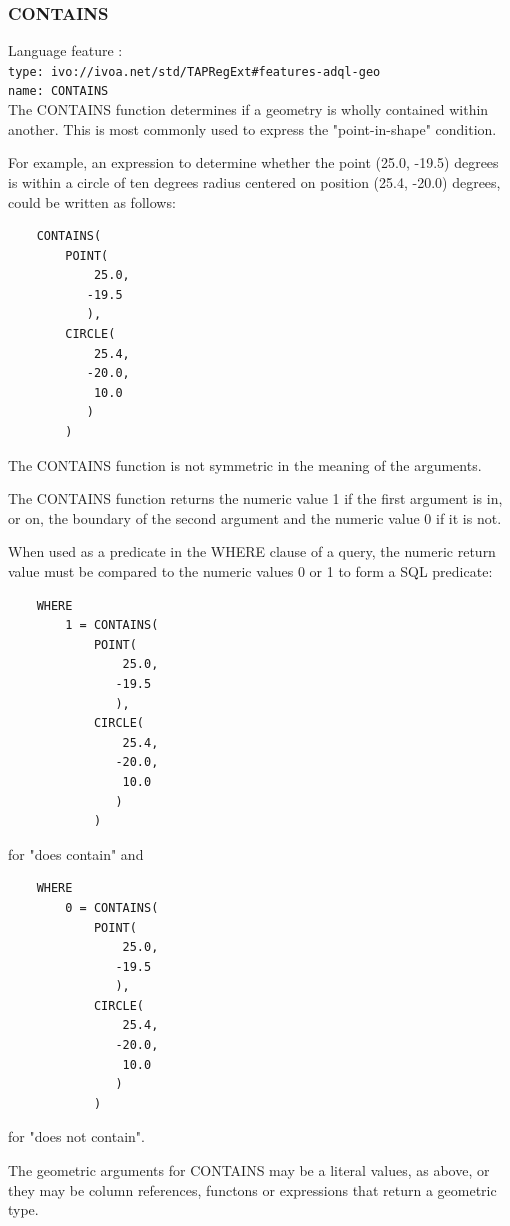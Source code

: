 \documentclass[11pt,a4paper]{ivoa}
\begin{document}
\subsubsection{CONTAINS}
\label{sec:functions.geom.contains}
{\footnotesize Language feature :}\\
{\footnotesize \verb|type: ivo://ivoa.net/std/TAPRegExt#features-adql-geo|}\\
{\footnotesize \verb|name: CONTAINS|}\\

The CONTAINS function determines if a geometry is wholly contained within
another. This is most commonly used to express the "point-in-shape" condition.

For example, an expression to determine whether the point (25.0, -19.5) degrees
is within a circle of ten degrees radius centered on position (25.4, -20.0) degrees,
could be written as follows:
\begin{verbatim}
    CONTAINS(
        POINT(
            25.0,
           -19.5
           ),
        CIRCLE(
            25.4,
           -20.0,
            10.0
           )
        )
\end{verbatim}

The CONTAINS function is not symmetric in the meaning of the arguments.

The CONTAINS function returns the numeric value 1 if the first argument
is in, or on, the boundary of the second argument and the numeric value 0
if it is not.

When used as a predicate in the WHERE clause of a query, the numeric return
value must be compared to the numeric values 0 or 1 to form a SQL predicate:
\begin{verbatim}
    WHERE
        1 = CONTAINS(
            POINT(
                25.0,
               -19.5
               ),
            CIRCLE(
                25.4,
               -20.0,
                10.0
               )
            )
\end{verbatim}
\noindent
for "does contain" and
\begin{verbatim}
    WHERE
        0 = CONTAINS(
            POINT(
                25.0,
               -19.5
               ),
            CIRCLE(
                25.4,
               -20.0,
                10.0
               )
            )
\end{verbatim}
\noindent
for "does not contain".

The geometric arguments for CONTAINS may be a literal values, as above,
or they may be column references, functons or expressions that return
a geometric type.
\end{document}
